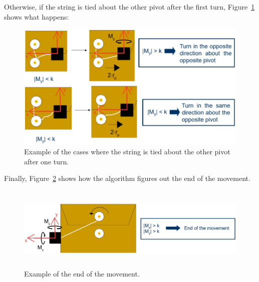 Otherwise, if the string is tied about the other pivot after the first turn, Figure~\ref{fig:other_pivot} shows what happens:
\begin{figure}[h!]
	\centering
	\includegraphics{chapters/figures/algorithm/otherpivot.jpg}
	\caption{Example of the cases where the string is tied about the other pivot after one turn.}
	\label{fig:other_pivot}
\end{figure}

 Finally, Figure~\ref{fig:end} shows how the algorithm figures out the end of the movement.
\begin{figure}[h!]
	\centering
	\includegraphics[height=40mm]{chapters/figures/algorithm/end.jpg}
	\caption{Example of the end of the movement.}
	\label{fig:end}
\end{figure}
\clearpage

